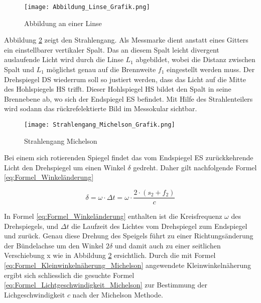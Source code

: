 \newpage

\begin{figure}[htb]
\texttt{[image: Abbildung\_Linse\_Grafik.png]}
\caption{Abbildung an einer Linse}
\label{fig:Abbildung an einer Linse}
\end{figure}

Abbildung \ref{fig:Strahlengang Michelson} zeigt den Strahlengang. Als Messmarke dient anstatt eines Gitters ein einstellbarer vertikaler Spalt. Das an diesem Spalt leicht divergent auslaufende Licht wird durch die Linse $L_{1}$ abgebildet, wobei die Distanz zwischen Spalt und $L_{1}$ möglichst genau auf die Brennweite $f_{1}$ eingestellt werden muss. Der Drehspiegel DS wiederrum soll so justiert werden, dass das Licht auf die Mitte des Hohlspiegels HS trifft. Dieser Hohlspiegel HS bildet den Spalt in seine Brennebene ab, wo sich der Endspiegel ES befindet. Mit Hilfe des Strahlenteilers wird sodann das rückrefelektierte Bild im Messokular sichtbar.

\begin{figure}[htb]
\texttt{[image: Strahlengang\_Michelson\_Grafik.png]}
\caption{Strahlengang Michelson}
\label{fig:Strahlengang Michelson}
\end{figure}

Bei einem sich rotierenden Spiegel findet das vom Endspiegel ES zurückkehrende Licht den Drehspiegel um einen Winkel $\delta$ gedreht. Daher gilt nachfolgende Formel \ref{eq:Formel_Winkeländerung}

\begin{equation}
\delta = \omega\cdot\Delta t = \omega\cdot\dfrac{2\cdot(s_{2}+f_{2})}{c}
\label{eq:Formel_Winkeländerung}
\end{equation}

In Formel \ref{eq:Formel_Winkeländerung} enthalten ist die Kreisfrequenz $\omega$ des Drehspiegels, und $\Delta t$ die Laufzeit des Lichtes vom Drehspiegel zum Endspiegel und zurück. Genau diese Drehung des Speigels führt zu einer Richtungsänderung der Bündelachse um den Winkel $2\delta$ und damit auch zu einer seitlichen Verschiebung x wie in Abbildung \ref{fig:Strahlengang Michelson} ersichtlich. Durch die mit Formel \ref{eq:Formel_Kleinwinkelnäherung_Michelson} angewendete Kleinwinkelnäherung ergibt sich schliesslich die gesuchte Formel \ref{eq:Formel_Lichtgeschwindigkeit_Michelson} zur Bestimmung der Lichgeschwindigkeit $c$ nach der Michelson Methode.

